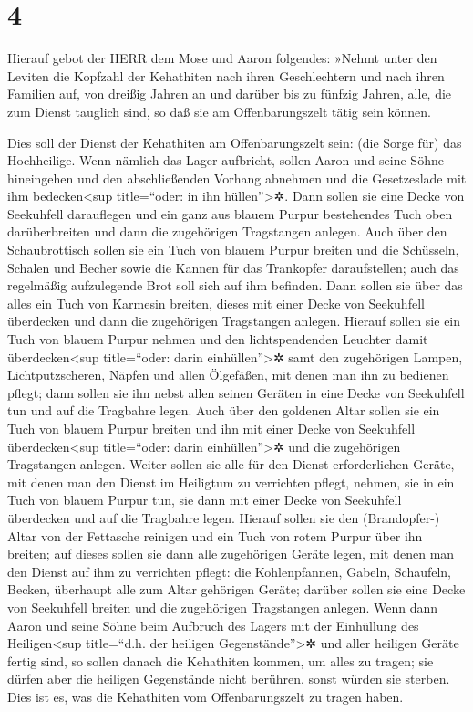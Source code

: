\hypertarget{section-3}{%
\section{4}\label{section-3}}

Hierauf gebot der HERR dem Mose und Aaron folgendes:
»Nehmt unter den Leviten die Kopfzahl der Kehathiten nach
ihren Geschlechtern und nach ihren Familien auf, von
dreißig Jahren an und darüber bis zu fünfzig Jahren, alle, die zum
Dienst tauglich sind, so daß sie am Offenbarungszelt tätig sein können.

Dies soll der Dienst der Kehathiten am Offenbarungszelt
sein: (die Sorge für) das Hochheilige. Wenn nämlich das
Lager aufbricht, sollen Aaron und seine Söhne hineingehen und den
abschließenden Vorhang abnehmen und die Gesetzeslade mit ihm
bedecken\textless sup title=``oder: in ihn hüllen''\textgreater✲.
Dann sollen sie eine Decke von Seekuhfell darauflegen und
ein ganz aus blauem Purpur bestehendes Tuch oben darüberbreiten und dann
die zugehörigen Tragstangen anlegen. Auch über den
Schaubrottisch sollen sie ein Tuch von blauem Purpur breiten und die
Schüsseln, Schalen und Becher sowie die Kannen für das Trankopfer
daraufstellen; auch das regelmäßig aufzulegende Brot soll sich auf ihm
befinden. Dann sollen sie über das alles ein Tuch von
Karmesin breiten, dieses mit einer Decke von Seekuhfell überdecken und
dann die zugehörigen Tragstangen anlegen. Hierauf sollen
sie ein Tuch von blauem Purpur nehmen und den lichtspendenden Leuchter
damit überdecken\textless sup title=``oder: darin
einhüllen''\textgreater✲ samt den zugehörigen Lampen, Lichtputzscheren,
Näpfen und allen Ölgefäßen, mit denen man ihn zu bedienen pflegt;
dann sollen sie ihn nebst allen seinen Geräten in eine
Decke von Seekuhfell tun und auf die Tragbahre legen.
Auch über den goldenen Altar sollen sie ein Tuch von
blauem Purpur breiten und ihn mit einer Decke von Seekuhfell
überdecken\textless sup title=``oder: darin einhüllen''\textgreater✲ und
die zugehörigen Tragstangen anlegen. Weiter sollen sie
alle für den Dienst erforderlichen Geräte, mit denen man den Dienst im
Heiligtum zu verrichten pflegt, nehmen, sie in ein Tuch von blauem
Purpur tun, sie dann mit einer Decke von Seekuhfell überdecken und auf
die Tragbahre legen. Hierauf sollen sie den (Brandopfer-)
Altar von der Fettasche reinigen und ein Tuch von rotem Purpur über ihn
breiten; auf dieses sollen sie dann alle zugehörigen
Geräte legen, mit denen man den Dienst auf ihm zu verrichten pflegt: die
Kohlenpfannen, Gabeln, Schaufeln, Becken, überhaupt alle zum Altar
gehörigen Geräte; darüber sollen sie eine Decke von Seekuhfell breiten
und die zugehörigen Tragstangen anlegen. Wenn dann Aaron
und seine Söhne beim Aufbruch des Lagers mit der Einhüllung des
Heiligen\textless sup title=``d.h. der heiligen
Gegenstände''\textgreater✲ und aller heiligen Geräte fertig sind, so
sollen danach die Kehathiten kommen, um alles zu tragen; sie dürfen aber
die heiligen Gegenstände nicht berühren, sonst würden sie sterben. Dies
ist es, was die Kehathiten vom Offenbarungszelt zu tragen haben.

